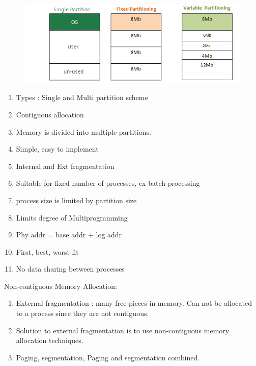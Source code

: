 \begin{enumerate}
  \begin{figure}[h]
      \centering   \includegraphics[scale=3]{./images/contigious_partition_01.jpeg}
  \end{figure}

  \begin{enumerate}
    \item Types : Single and Multi partition scheme
    \item Contiguous allocation
    \item Memory is divided into multiple partitions.
    \item Simple, easy to implement
    \item Internal and Ext fragmentation
    \item Suitable for fixed number of processes, ex batch processing
    \item process size is limited by partition size
    \item Limits degree of Multiprogramming
    \item Phy addr = base addr + log addr
    \item First, best, worst fit
    \item No data sharing between processes
  \end{enumerate}

  \begin{minipage}{\linewidth}
    \item Non-contiguous Memory Allocation:
    \begin{enumerate}
      \item External fragmentation : many free pieces in memory. Can not be allocated to a process since they are not contiguous.
      \item Solution to external fragmentation is to use non-contiguous memory allocation techniques.
      \item Paging, segmentation, Paging and segmentation combined.
    \end{enumerate}
  \end{minipage}

\end{enumerate}

